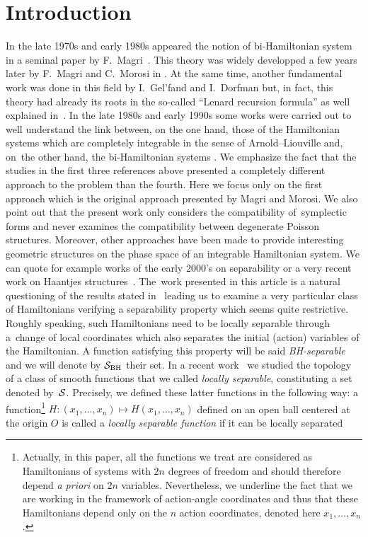 \documentclass[pdftex]{sigma}%
\numberwithin{equation}{section}
\begin{document}
\section{Introduction}

In the late 1970s and early 1980s appeared the notion of bi-Hamiltonian system in a seminal paper by F.~Magri~\cite{Mag}. This theory was widely developped a few years later by F.~Magri and C.~Morosi in \cite{MaMo}. At the same time, another fundamental work was done in this field by I.~Gel'fand and I.~Dorfman \cite{GD} but, in fact, this theory had already its roots in the so-called ``Lenard recursion formula'' as well explained in~\cite{PS}. In the late 1980s and early 1990s some works were carried out to well understand the link between, on the one hand, those of the Hamiltonian systems which are completely integrable in the sense of Arnold--Liouville and, on~the other hand, the bi-Hamiltonian systems \cite{Br, BrMoTu,Fe, Mar}. We emphasize the fact that the studies in the first three references above presented a completely different approach to the problem than the fourth. Here we focus only on the first approach which is the original approach presented by Magri and Morosi. We also point out that the present work only considers the compatibility of~symplectic forms and never examines the compatibility between degenerate Poisson structures. Moreover, other approaches have been made to provide interesting geometric structures on the phase space of an integrable Hamiltonian system. We can quote for example works of the early 2000's on separability \cite{FP,IMM} or a very recent work on Haantjes structures~\cite{TT}. The~work presented in this article is a natural questioning of the results stated in~\cite{Br, BrMoTu,Fe} leading us to examine a very particular class of Hamiltonians verifying a separability property which seems quite restrictive. Roughly speaking, such Hamiltonians need to be locally separable through a~change of local coordinates which also separates the initial (action) variables of the Hamiltonian. A function satisfying this property will be said {\it BH-separable} and we will denote by ${\cal S}_{\rm BH}$ their set. In a recent work~\cite{BouBr} we studied the topology of a class of smooth functions that we called {\it locally separable}, constituting a set denoted by~${\cal S}$. Precisely, we defined these latter functions in the following way:
a function\footnote{Actually, in this paper, all the functions we treat are considered as Hamiltonians of systems with $2n$ degrees of freedom and should therefore depend {\it a priori} on $2n$ variables. Nevertheless, we underline the fact that we are working in the framework of action-angle coordinates and thus that these Hamiltonians depend only on the $n$ action coordinates, denoted here $x_1,\dots,x_n$.} $H\colon (x_1,\dots,x_n)\mapsto H(x_1,\dots,x_n)$ defined on an open ball centered at the origin $O$ is called a {\it locally separable function} if it can be locally separated
\end{document}
